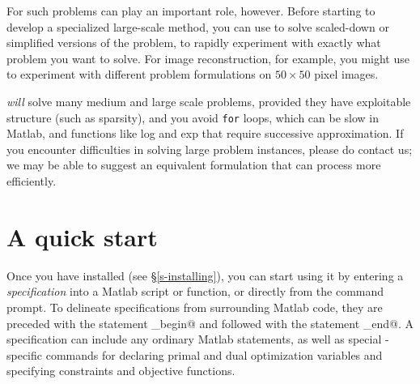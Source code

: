 \documentclass[12pt]{article}
\begin{document}
For such problems \cvx can play an important role, however.  Before
starting to develop a specialized large-scale method, you can use \cvx
to solve scaled-down or simplified versions of the problem, to rapidly
experiment with exactly what problem you want to solve.
For image reconstruction, for example, you might use \cvx to experiment
with different problem formulations on $50 \times 50$ pixel images.

\cvx \emph{will}
solve many medium and large scale problems, provided they
have exploitable structure (such as sparsity), and you 
avoid \verb+for+ loops, which can be slow in Matlab, and functions
like log and exp that require successive approximation.
If you encounter difficulties in solving large problem instances,
please do contact us; we may be able to suggest
an equivalent formulation that \cvx can process more efficiently.




\newpage
\section{A quick start}
\label{sec:quickstart}

Once you have installed \cvx (see \S\ref{s-installing}), you can
start using it by entering a \cvx \emph{specification} into a
Matlab script or function, or directly from the command prompt.
To delineate \cvx specifications from surrounding Matlab code,
they are preceded with the statement
\verb@cvx_begin@ and followed with the statement
\verb@cvx_end@. A specification can
include any ordinary Matlab statements, as well as
special \cvx-specific commands for declaring primal and dual 
optimization variables and specifying constraints and
objective functions.
\end{document}
